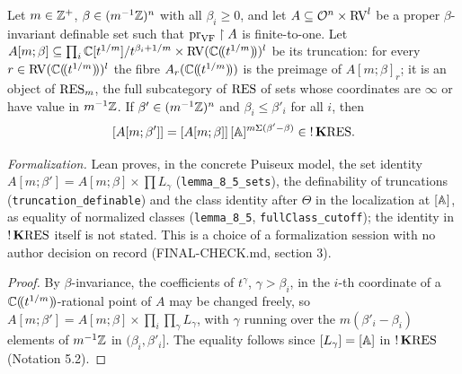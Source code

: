 \setcounter{theorem}{4}
\begin{lemma}
\label{s8-truncation-cutoff}
\leanok
{}
Let $m \in \mathbb{Z}^+$, $\beta \in (m^{-1}\mathbb{Z})^n$ with all $\beta_i \geq 0$, and let $A \subseteq \mathcal O^n \times \mathrm{RV}^l$ be a proper $\beta$-invariant definable set such that $\operatorname{pr}_{\mathrm{VF}} \upharpoonright A$ is finite-to-one. Let $A[m;\beta] \subseteq \prod_i \mathbb{C}[t^{1/m}]/t^{\beta_i + 1/m} \times \mathrm{RV}(\mathbb{C}(\!(t^{1/m})\!))^l$ be its truncation: for every $r \in \mathrm{RV}(\mathbb{C}(\!(t^{1/m})\!))^l$ the fibre $A_r(\mathbb{C}(\!(t^{1/m})\!))$ is the preimage of $A[m;\beta]_r$; it is an object of $\mathrm{RES}_m$, the full subcategory of $\mathrm{RES}$ of sets whose coordinates are $\infty$ or have value in $m^{-1}\mathbb{Z}$. If $\beta' \in (m^{-1}\mathbb{Z})^n$ and $\beta_i \leq \beta'_i$ for all $i$, then \[ [A[m;\beta']] = [A[m;\beta]]\,[\mathbb{A}]^{m \Sigma(\beta' - \beta)} \in {!\operatorname{\mathbf{K}}}\mathrm{RES}. \]

\emph{Formalization.} Lean proves, in the concrete Puiseux model, the set identity $A[m;\beta'] = A[m;\beta] \times \prod L_\gamma$ (\texttt{lemma\_8\_5\_sets}), the definability of truncations (\texttt{truncation\_definable}) and the class identity after $\Theta$ in the localization at $[\mathbb{A}]$, as equality of normalized classes (\texttt{lemma\_8\_5}, \texttt{fullClass\_cutoff}); the identity in ${!\operatorname{\mathbf{K}}}\mathrm{RES}$ itself is not stated. This is a choice of a formalization session with no author decision on record (FINAL-CHECK.md, section 3).
\end{lemma}

\begin{proof}
By $\beta$-invariance, the coefficients of $t^\gamma$, $\gamma > \beta_i$, in the $i$-th coordinate of a $\mathbb{C}(\!(t^{1/m})\!)$-rational point of $A$ may be changed freely, so $A[m;\beta'] = A[m;\beta] \times \prod_i \prod_\gamma L_\gamma$, with $\gamma$ running over the $m(\beta'_i - \beta_i)$ elements of $m^{-1}\mathbb{Z}$ in $(\beta_i, \beta'_i]$. The equality follows since $[L_\gamma] = [\mathbb{A}]$ in ${!\operatorname{\mathbf{K}}}\mathrm{RES}$ (Notation 5.2).
\end{proof}

